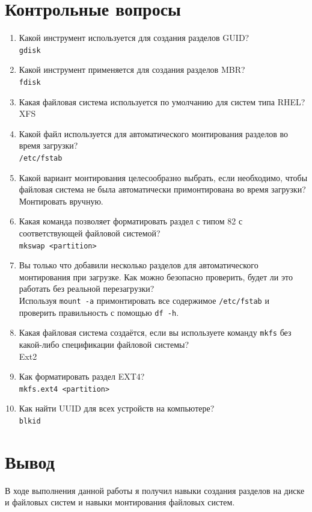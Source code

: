 \documentclass[12pt]{article}
\begin{document}
\section{Контрольные вопросы}
\begin{enumerate}
	\item Какой инструмент используется для создания разделов GUID? \\
	      \texttt{gdisk}
	\item Какой инструмент применяется для создания разделов MBR? \\
	      \texttt{fdisk}
	\item Какая файловая система используется по умолчанию для систем типа RHEL? \\
	      XFS
	\item Какой файл используется для автоматического монтирования разделов во время загрузки? \\
	      \texttt{/etc/fstab}
	\item Какой вариант монтирования целесообразно выбрать, если необходимо, чтобы файловая система не была автоматически примонтирована во время загрузки? \\
	      Монтировать вручную.
	\item Какая команда позволяет форматировать раздел с типом 82 с соответствующей файловой системой? \\
	      \texttt{mkswap <partition>}
	\item Вы только что добавили несколько разделов для автоматического монтирования при загрузке.
	      Как можно безопасно проверить, будет ли это работать без реальной перезагрузки? \\
	      Используя \texttt{mount -a} примонтировать все содержимое \texttt{/etc/fstab} и проверить правильность с помощью \texttt{df -h}.
	\item Какая файловая система создаётся, если вы используете команду \texttt{mkfs} без какой-либо спецификации файловой системы? \\
	      Ext2
	\item Как форматировать раздел EXT4? \\
	      \texttt{mkfs.ext4 <partition>}
	\item Как найти UUID для всех устройств на компьютере? \\
	      \texttt{blkid}
\end{enumerate}

\section{Вывод}
В ходе выполнения данной работы я получил навыки создания разделов на диске и файловых систем и навыки монтирования файловых систем.
\end{document}
